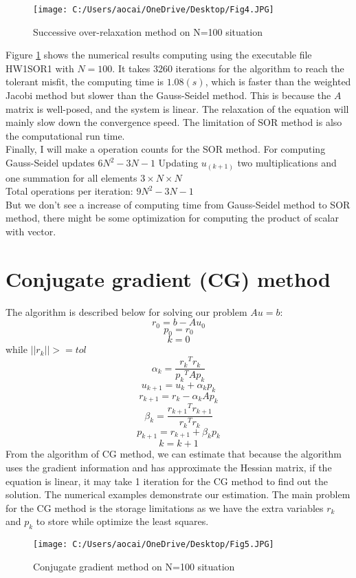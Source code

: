 \documentclass[12pt]{article}
\begin{document}
\begin{figure}[H]
	\centering
	\texttt{[image: C:/Users/aocai/OneDrive/Desktop/Fig4.JPG]}
	\caption[Optional caption]{Successive over-relaxation method on N=100 situation}
	\label{fig:6}
\end{figure}
Figure \ref{fig:6} shows the numerical results computing using the executable file HW1SOR1 with $N=100$. It takes 3260 iterations for the algorithm to reach the tolerant misfit, the computing time is $1.08(s)$, which is faster than the weighted Jacobi method but slower than the Gauss-Seidel method. This is because the $A$ matrix is well-posed, and the system is linear. The relaxation of the equation will mainly slow down the convergence speed. The limitation of SOR method is also the computational run time.\\

Finally, I will make a operation counts for the SOR method. 
For computing Gauss-Seidel updates $6N^2 - 3N -1$ 
Updating $u_{(k+1)}$ two multiplications and one summation for all elements $3\times N\times N$\\
Total operations per iteration: $9N^2 - 3N -1$\\

But we don't see a increase of computing time from Gauss-Seidel method to SOR method, there might be some optimization for computing the product of scalar with vector.

\section{Conjugate gradient (CG) method}
The algorithm is described below for solving our problem $Au=b$:
$$r_0 = b - Au_0 $$
$$p_0 = r_0 $$
$$k = 0$$
while $\left|| r_k \right|| >= tol $
$${\alpha}_k = \frac{{r_k}^T r_k}{{p_k}^T Ap_k}$$
$$u_{k+1} = u_k +{\alpha}_k p_k$$
$$r_{k+1} = r_k -{\alpha}_k Ap_k$$
$${\beta}_k = \frac{{r_{k+1}}^T{r_{k+1}}}{{r_k}^Tr_k}$$
$$p_{k+1} = r_{k+1} + \beta_kp_k$$
$$k=k+1$$
From the algorithm of CG method, we can estimate that because the algorithm uses the gradient information and has approximate the Hessian matrix, if the equation is linear, it may take 1 iteration for the CG method to find out the solution. The numerical examples demonstrate our estimation. The main problem for the CG method is the storage limitations as we have the extra variables $r_k$ and $p_k$ to store while optimize the least squares.

\begin{figure}[H]
	\centering
	\texttt{[image: C:/Users/aocai/OneDrive/Desktop/Fig5.JPG]}
	\caption[Optional caption]{Conjugate gradient method on N=100 situation}
	\label{fig:7}
\end{figure}
\end{document}
